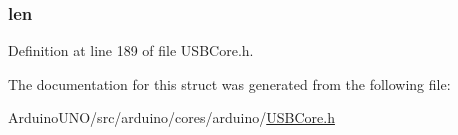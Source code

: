\subsubsection[{len}]{ len}\label{struct_i_a_d_descriptor_afbf3f3230446569534d5f466aaf4c23b}


Definition at line 189 of file U\+S\+B\+Core.\+h.



The documentation for this struct was generated from the following file\+:\begin{DoxyCompactItemize}
\item 
Arduino\+U\+N\+O/src/arduino/cores/arduino/\hyperlink{_u_s_b_core_8h}{U\+S\+B\+Core.\+h}\end{DoxyCompactItemize}
